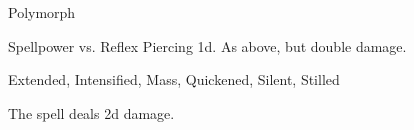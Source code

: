 \begin{spellsection}{Polymorph}
\begin{spellheader}
\end{spellheader}
\begin{spellcontent}
\begin{spelltargetinginfo}
\end{spelltargetinginfo}
\begin{spelleffects}
\begin{spellattack}{Spellpower vs. Reflex}
\spellsuccess Piercing  \plus1d.
\spellcritical As above, but double damage.
\end{spellattack}
\end{spelleffects}
\end{spellcontent}
\begin{spellfooter}
 Extended, Intensified, Mass, Quickened, Silent, Stilled
\end{spellfooter}
\begin{spellsubcontent}
\begin{spellcantrip}
The spell deals \minus2d damage.
\end{spellcantrip}
\end{spellsubcontent}
\end{spellsection}
